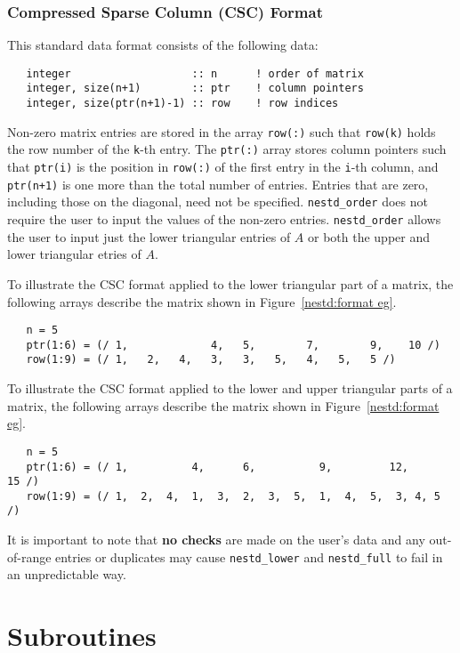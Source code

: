 \subsubsection{Compressed Sparse Column (CSC) Format} \label{nestd:cscformat}
This standard data format consists of the following data:
\begin{verbatim}
   integer                   :: n      ! order of matrix
   integer, size(n+1)        :: ptr    ! column pointers
   integer, size(ptr(n+1)-1) :: row    ! row indices
\end{verbatim}
Non-zero matrix entries are  stored in
the array \texttt{row(:)}  such that \texttt{row(k)} holds
the row number of the \texttt{k}-th entry.
The \texttt{ptr(:)} array stores column pointers such that \texttt{ptr(i)} is
the position in \texttt{row(:)}  of
the first entry in the \texttt{i}-th column, and \texttt{ptr(n+1)} is one more
than the total number of entries.
Entries that are zero, including those on the diagonal, need not be specified. 
\texttt{nestd\_order} does not require the user to 
input the values of the non-zero entries.
\texttt{nestd\_order} allows the user to input just the lower triangular 
entries of $A$  or both the upper and lower triangular etries of $A.$

To illustrate the CSC format applied to the lower triangular part of a matrix, 
the following arrays describe the matrix shown in
Figure~\ref{nestd:format eg}.
\begin{verbatim}
   n = 5
   ptr(1:6) = (/ 1,             4,   5,        7,        9,    10 /)
   row(1:9) = (/ 1,   2,   4,   3,   3,   5,   4,   5,   5 /)
\end{verbatim}

To illustrate the CSC format applied to the lower and upper triangular parts of 
a matrix, the following arrays describe the matrix shown in
Figure~\ref{nestd:format eg}.
\begin{verbatim}
   n = 5
   ptr(1:6) = (/ 1,          4,      6,          9,         12,       15 /)
   row(1:9) = (/ 1,  2,  4,  1,  3,  2,  3,  5,  1,  4,  5,  3, 4, 5 /)
\end{verbatim}


It is important to note
that {\bf no checks} are made on the user's data and any out-of-range entries 
or duplicates may cause {\tt nestd\_lower} and 
\texttt{nestd\_full} to fail in an unpredictable way. 



\section{Subroutines}


